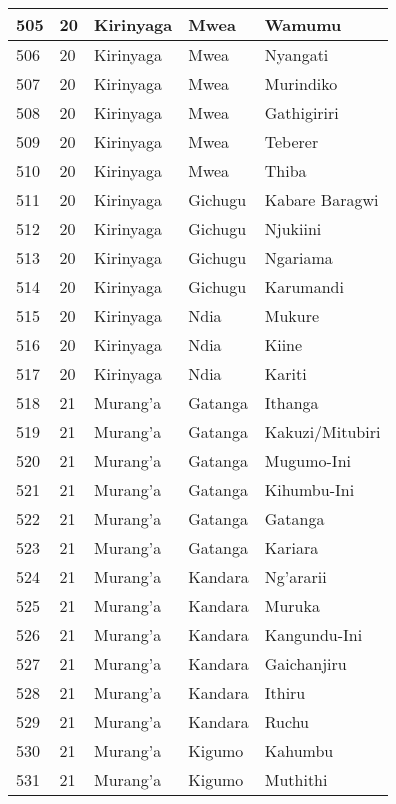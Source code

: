 \begin{table}[!ht]
\begin{tabular}{|l|l|l|l|l|}
        505 & 20 & Kirinyaga & Mwea & Wamumu \\ \hline
        506 & 20 & Kirinyaga & Mwea & Nyangati \\ \hline
        507 & 20 & Kirinyaga & Mwea & Murindiko \\ \hline
        508 & 20 & Kirinyaga & Mwea & Gathigiriri \\ \hline
        509 & 20 & Kirinyaga & Mwea & Teberer \\ \hline
        510 & 20 & Kirinyaga & Mwea & Thiba \\ \hline
        511 & 20 & Kirinyaga & Gichugu & Kabare Baragwi \\ \hline
        512 & 20 & Kirinyaga & Gichugu & Njukiini \\ \hline
        513 & 20 & Kirinyaga & Gichugu & Ngariama \\ \hline
        514 & 20 & Kirinyaga & Gichugu & Karumandi \\ \hline
        515 & 20 & Kirinyaga & Ndia & Mukure \\ \hline
        516 & 20 & Kirinyaga & Ndia & Kiine \\ \hline
        517 & 20 & Kirinyaga & Ndia & Kariti \\ \hline
        518 & 21 & Murang’a & Gatanga & Ithanga \\ \hline
        519 & 21 & Murang’a & Gatanga & Kakuzi/Mitubiri \\ \hline
        520 & 21 & Murang’a & Gatanga & Mugumo-Ini \\ \hline
        521 & 21 & Murang’a & Gatanga & Kihumbu-Ini \\ \hline
        522 & 21 & Murang’a & Gatanga & Gatanga \\ \hline
        523 & 21 & Murang’a & Gatanga & Kariara \\ \hline
        524 & 21 & Murang’a & Kandara & Ng’ararii \\ \hline
        525 & 21 & Murang’a & Kandara & Muruka \\ \hline
        526 & 21 & Murang’a & Kandara & Kangundu-Ini \\ \hline
        527 & 21 & Murang’a & Kandara & Gaichanjiru \\ \hline
        528 & 21 & Murang’a & Kandara & Ithiru \\ \hline
        529 & 21 & Murang’a & Kandara & Ruchu \\ \hline
        530 & 21 & Murang’a & Kigumo & Kahumbu \\ \hline
        531 & 21 & Murang’a & Kigumo & Muthithi \\ \hline

\end{tabular}
\end{table}
